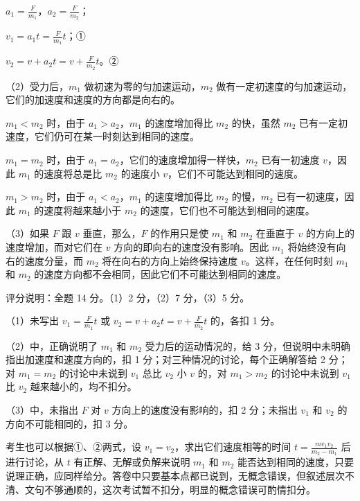 \documentclass[\gkver]{gaokaozhenti}
\begin{document}
\begin{enumerate}
{$a_{1}=\frac{F}{m_{1}}$，$a_{2}=\frac{F}{m_{2}}$；

$v_{1}=a_{1}t=\frac{F}{m_{1}}t$；①

$v_{2}=v+a_{2}t=v+\frac{F}{m_{2}}t$。②

（2）受力后，$m_{1}$ 做初速为零的匀加速运动，$m_{2}$ 做有一定初速度的匀加速运动，它们的加速度和速度的方向都是向右的。

$m_{1}<m_{2}$ 时，由于 $a_{1}>a_{2}$，$m_{1}$ 的速度增加得比 $m_{2}$ 的快，虽然 $m_{2}$ 已有一定初速度，它们仍可在某一时刻达到相同的速度。

$m_{1}=m_{2}$ 时，由于 $a_{1}=a_{2}$，它们的速度增加得一样快，$m_{2}$ 已有一初速度 $v$，因此 $m_{1}$ 的速度将总是比 $m_{2}$ 的速度小 $v$，它们不可能达到相同的速度。

$m_{1}>m_{2}$ 时，由于 $a_{1}<a_{2}$，$m_{1}$ 的速度增加得比 $m_{2}$ 的慢，$m_{2}$ 已有一初速度，因此 $m_{1}$ 的速度将越来越小于 $m_{2}$ 的速度，它们也不可能达到相同的速度。

（3）如果 $F$ 跟 $v$ 垂直，那么，$F$ 的作用只是使 $m_{1}$ 和 $m_{2}$ 在垂直于 $v$ 的方向上的速度增加，而对它们在 $v$ 方向的即向右的速度没有影响。因此 $m_{1}$ 将始终没有向右的速度分量，而 $m_{2}$ 将在向右的方向上始终保持速度 $v$。这样，在任何时刻 $m_{1}$ 和 $m_{2}$ 的速度方向都不会相同，因此它们不可能达到相同的速度。

评分说明：全题 14 分。（1）2 分，（2）7 分，（3）5 分。

（1）未写出 $v_{1}=\frac{F}{m_{1}}t$ 或 $v_{2}=v+a_{2}t=v+\frac{F}{m_{2}}t$ 的，各扣 1 分。

（2）中，正确说明了 $m_{1}$ 和 $m_{2}$ 受力后的运动情况的，给 3 分，但说明中未明确指出加速度和速度方向的，扣 1 分；对三种情况的讨论，每个正确解答给 2 分；对 $m_{1}=m_{2}$ 的讨论中未说到 $v_{1}$ 总比 $v_{2}$ 小 $v$ 的，对 $m_{1}>m_{2}$ 的讨论中未说到 $v_{1}$ 比 $v_{2}$ 越来越小的，均不扣分。

（3）中，未指出 $F$ 对 $v$ 方向上的速度没有影响的，扣 2 分；未指出 $v_{1}$ 和 $v_{2}$ 的方向不可能相同的，扣 3 分。

考生也可以根据①、②两式，设 $v_{1}=v_{2}$，求出它们速度相等的时间 $t=\frac{mv_{1}v_{2}}{m_{2}-m_{1}}$ 后进行讨论，从 $t$ 有正解、无解或负解来说明 $m_{1}$ 和 $m_{2}$ 能否达到相同的速度，只要说理正确，应同样给分。答卷中只要基本点都已说到，无概念错误，但叙述层次不清、文句不够通顺的，这次考试暂不扣分，明显的概念错误可酌情扣分。
}

\end{enumerate}
\end{document}
